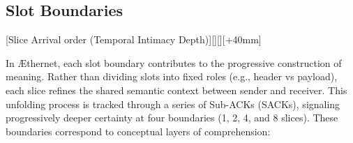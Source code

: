 \documentclass[../../../OAE-SPEC-MAIN.tex]{subfiles}
\begin{document}

\subsection{Slot Boundaries}

[Slice Arrival order (Temporal Intimacy Depth)][][\hspace{-18pt}][+40mm]

In \AE thernet, each slot boundary contributes to the progressive construction of meaning. Rather than dividing slots into fixed roles (e.g., header vs payload), each slice refines the shared semantic context between sender and receiver. This unfolding process is tracked through a series of Sub-ACKs (SACKs), signaling progressively deeper certainty at four boundaries (1, 2, 4, and 8 slices). These boundaries correspond to conceptual layers of comprehension:
\end{document}
